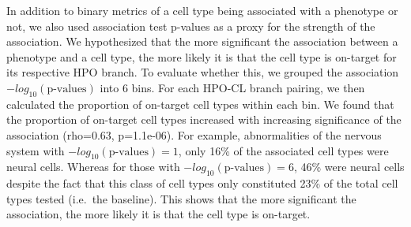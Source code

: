 \documentclass[
]{article}
\begin{document}
In addition to binary metrics of a cell type being associated with a
phenotype or not, we also used association test p-values as a proxy for
the strength of the association. We hypothesized that the more
significant the association between a phenotype and a cell type, the
more likely it is that the cell type is on-target for its respective HPO
branch. To evaluate whether this, we grouped the association
\(-log_{10}(\text{p-values})\) into 6 bins. For each HPO-CL branch
pairing, we then calculated the proportion of on-target cell types
within each bin. We found that the proportion of on-target cell types
increased with increasing significance of the association (rho=0.63,
p=1.1e-06). For example, abnormalities of the nervous system with
\(-log_{10}(\text{p-values}) = 1\), only 16\% of the associated cell
types were neural cells. Whereas for those with
\(-log_{10}(\text{p-values}) = 6\), 46\% were neural cells despite the
fact that this class of cell types only constituted 23\% of the total
cell types tested (i.e.~the baseline). This shows that the more
significant the association, the more likely it is that the cell type is
on-target.
\end{document}
